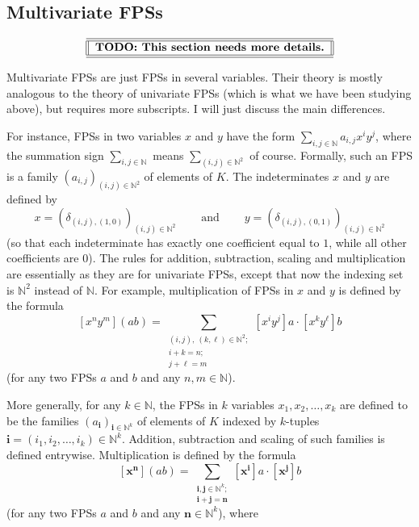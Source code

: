 \subsection{\label{sec.gf.multivar}Multivariate FPSs}%

\[%
\begin{tabular}
[c]{||l||}\hline\hline
\textbf{TODO: This section needs more details.}\\\hline\hline
\end{tabular}
\]


Multivariate FPSs are just FPSs in several variables. Their theory is mostly
analogous to the theory of univariate FPSs (which is what we have been
studying above), but requires more subscripts. I will just discuss the main differences.

For instance, FPSs in two variables $x$ and $y$ have the form $\sum
_{i,j\in\mathbb{N}}a_{i,j}x^{i}y^{j}$, where the summation sign $\sum
_{i,j\in\mathbb{N}}$ means $\sum_{\left(  i,j\right)  \in\mathbb{N}^{2}}$ of
course. Formally, such an FPS is a family $\left(  a_{i,j}\right)  _{\left(
i,j\right)  \in\mathbb{N}^{2}}$ of elements of $K$. The indeterminates $x$ and
$y$ are defined by%
\[
x=\left(  \delta_{\left(  i,j\right)  ,\left(  1,0\right)  }\right)  _{\left(
i,j\right)  \in\mathbb{N}^{2}}\ \ \ \ \ \ \ \ \ \ \text{and}%
\ \ \ \ \ \ \ \ \ \ y=\left(  \delta_{\left(  i,j\right)  ,\left(  0,1\right)
}\right)  _{\left(  i,j\right)  \in\mathbb{N}^{2}}%
\]
(so that each indeterminate has exactly one coefficient equal to $1$, while
all other coefficients are $0$). The rules for addition, subtraction, scaling
and multiplication are essentially as they are for univariate FPSs, except
that now the indexing set is $\mathbb{N}^{2}$ instead of $\mathbb{N}$. For
example, multiplication of FPSs in $x$ and $y$ is defined by the formula%
\[
\left[  x^{n}y^{m}\right]  \left(  ab\right)  =\sum_{\substack{\left(
i,j\right)  ,\ \left(  k,\ell\right)  \in\mathbb{N}^{2};\\i+k=n;\\j+\ell
=m}}\left[  x^{i}y^{j}\right]  a\cdot\left[  x^{k}y^{\ell}\right]  b
\]
(for any two FPSs $a$ and $b$ and any $n,m\in\mathbb{N}$).

More generally, for any $k\in\mathbb{N}$, the FPSs in $k$ variables
$x_{1},x_{2},\ldots,x_{k}$ are defined to be the families $\left(
a_{\mathbf{i}}\right)  _{\mathbf{i}\in\mathbb{N}^{k}}$ of elements of $K$
indexed by $k$-tuples $\mathbf{i}=\left(  i_{1},i_{2},\ldots,i_{k}\right)
\in\mathbb{N}^{k}$. Addition, subtraction and scaling of such families is
defined entrywise. Multiplication is defined by the formula%
\[
\left[  \mathbf{x}^{\mathbf{n}}\right]  \left(  ab\right)  =\sum
_{\substack{\mathbf{i},\mathbf{j}\in\mathbb{N}^{k};\\\mathbf{i}+\mathbf{j}%
=\mathbf{n}}}\left[  \mathbf{x}^{\mathbf{i}}\right]  a\cdot\left[
\mathbf{x}^{\mathbf{j}}\right]  b
\]
(for any two FPSs $a$ and $b$ and any $\mathbf{n}\in\mathbb{N}^{k}$), where

